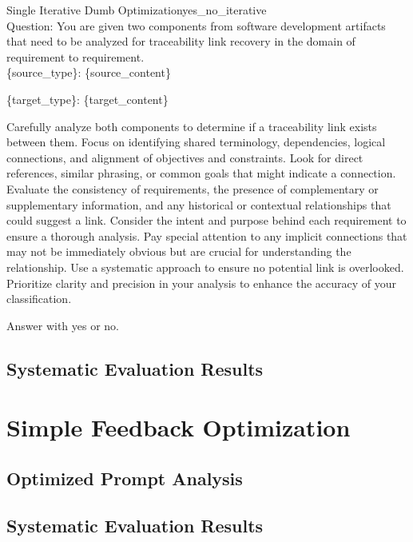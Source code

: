 \begin{prompt}{\KISS Single Iterative Dumb Optimization}{yes_no_iterative}\\
    Question: You are given two components from software development artifacts that need to be analyzed for traceability link recovery in the domain of requirement to requirement.\\
    
    \{source\_type\}: \tripplequote\{source\_content\}\tripplequote

    \{target\_type\}: \tripplequote\{target\_content\}\tripplequote

    Carefully analyze both components to determine if a traceability link exists between them. Focus on identifying shared terminology, dependencies, logical connections, and alignment of objectives and constraints. Look for direct references, similar phrasing, or common goals that might indicate a connection. Evaluate the consistency of requirements, the presence of complementary or supplementary information, and any historical or contextual relationships that could suggest a link. Consider the intent and purpose behind each requirement to ensure a thorough analysis. Pay special attention to any implicit connections that may not be immediately obvious but are crucial for understanding the relationship. Use a systematic approach to ensure no potential link is overlooked. Prioritize clarity and precision in your analysis to enhance the accuracy of your classification.

    Answer with \textquotesingle{}yes\textquotesingle{} or \textquotesingle{}no\textquotesingle{}.
    
\end{prompt}

\subsection{Systematic Evaluation Results}

\begin{table}
    \centering
    \renewcommand{\arraystretch}{1.4}
    
    \renewcommand{\arraystretch}{1}
    \caption{Naive prompt optimization approach prompting the model to optimize the classification prompt}
    \label{tab:naive_optimization}
\end{table}

\newpage
\section{Simple Feedback Optimization}
\subsection{Optimized Prompt Analysis}
\subsection{Systematic Evaluation Results}

\begin{table}
    \centering
    
    \caption{Naive prompt optimization approach considering previous misclassified \TLs}
    \label{tab:placeholder}
\end{table}